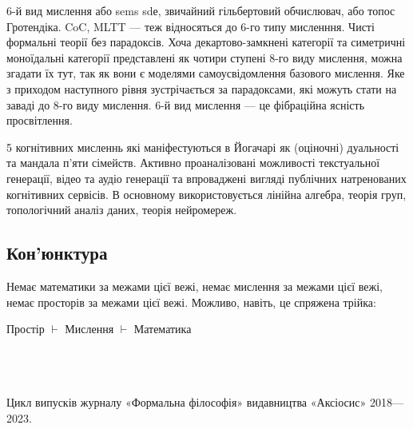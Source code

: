 6-й вид мислення або sems sdе, звичайний гільбертовий обчислювач, або топос Гротендіка.
CoC, MLTT — теж відносяться до 6-го типу мисленння. Чисті формальні теорії без парадоксів.
Хоча декартово-замкнені категорії та симетричні моноїдальні категорії представлені як чотири
ступені 8-го виду мислення, можна згадати їх тут, так як вони є моделями самоусвідомлення
базового мислення. Яке з приходом наступного рівня зустрічається за парадоксами, які можуть
стати на заваді до 8-го виду мислення. 6-й вид мислення --- це фібраційна ясність просвітлення.

5 когнітивних мисленнь які маніфестуються в Йогачарі як (оціночні) дуальності та мандала
п'яти сімейств. Активно проаналізовані можливості текстуальної генерації, відео та аудіо
генерації та впроваджені вигляді публічних натренованих когнітивних сервісів. В основному
використовується лінійна алгебра, теорія груп, топологічний аналіз даних, теорія нейромереж.

\subsection*{Кон'юнктура}

Немає математики за межами цієї вежі, немає мислення за межами цієї вежі, немає просторів
за межами цієї вежі. Можливо, навіть, це спряжена трійка:
\begin{center}Простір $\vdash$ Мислення $\vdash$ Математика\end{center}
\vspace{3cm}
\\
\\
\\
\footnotesize
Цикл випусків журналу «Формальна філософія» видавництва «Аксіосис» 2018—2023.
